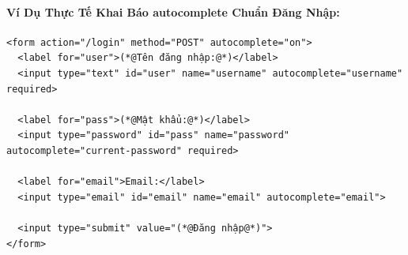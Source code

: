 \documentclass[11pt,oneside]{book}
\begin{document}
\paragraph{Ví Dụ Thực Tế Khai Báo autocomplete Chuẩn Đăng Nhập:}

\begin{codeWindow}
\begin{lstlisting}[language=HTML5]
<form action="/login" method="POST" autocomplete="on">
  <label for="user">(*@Tên đăng nhập:@*)</label>
  <input type="text" id="user" name="username" autocomplete="username" required>

  <label for="pass">(*@Mật khẩu:@*)</label>
  <input type="password" id="pass" name="password" autocomplete="current-password" required>

  <label for="email">Email:</label>
  <input type="email" id="email" name="email" autocomplete="email">

  <input type="submit" value="(*@Đăng nhập@*)">
</form>
\end{lstlisting}
\end{codeWindow}
\end{document}
